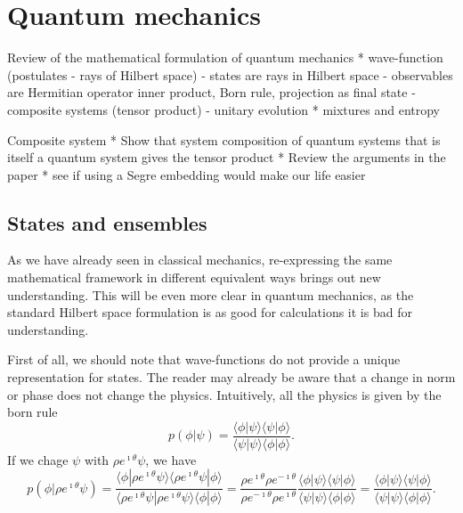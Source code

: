 

\def\>{\rangle}
\def\<{\langle}

\newcommand{\indicator}[1][A] {\mathbf{1}_{#1}} %



\chapter{Quantum mechanics}


Review of the mathematical formulation of quantum mechanics
* wave-function (postulates - rays of Hilbert space)
- states are rays in Hilbert space
- observables are Hermitian operator inner product, Born rule, projection as final state
- composite systems (tensor product)
- unitary evolution
* mixtures and entropy

Composite system
* Show that system composition of quantum systems that is itself a quantum system gives the tensor product
* Review the arguments in the paper
* see if using a Segre embedding would make our life easier

\section{States and ensembles}

As we have already seen in classical mechanics, re-expressing the same mathematical framework in different equivalent ways brings out new understanding. This will be even more clear in quantum mechanics, as the standard Hilbert space formulation is as good for calculations it is bad for understanding.

First of all, we should note that wave-functions do not provide a unique representation for states. The reader may already be aware that a change in norm or phase does not change the physics. Intuitively, all the physics is given by the born rule
\begin{equation}
	p(\phi|\psi) = \frac{\< \phi | \psi \>\< \psi | \phi \>}{\< \psi | \psi \>\< \phi | \phi \>}.
\end{equation}
If we chage $\psi$ with $\rho e^{\imath \theta} \psi$, we have
\begin{equation}
	p(\phi|\rho e^{\imath \theta}\psi) = \frac{\< \phi |\rho e^{\imath \theta}\psi \>\<\rho e^{\imath \theta}\psi | \phi \>}{\< \rho e^{\imath \theta}\psi | \rho e^{\imath \theta}\psi \>\< \phi | \phi \>} = \frac{\rho e^{\imath \theta}\rho e^{-\imath \theta}}{\rho e^{-\imath \theta}\rho e^{\imath \theta}}\frac{\< \phi | \psi \>\< \psi | \phi \>}{\< \psi | \psi \>\< \phi | \phi \>}=\frac{\< \phi | \psi \>\< \psi | \phi \>}{\< \psi | \psi \>\< \phi | \phi \>}.
\end{equation}

